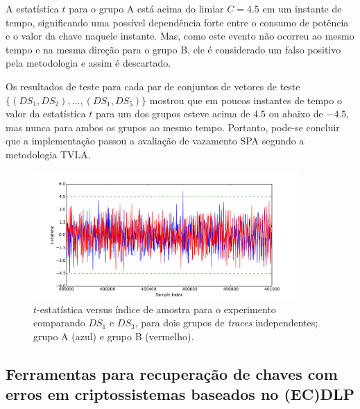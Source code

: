 \documentclass{SBCbookchapter}
\begin{document}
A estatística $t$ para o grupo A está acima do limiar $C = 4.5$ em um instante de tempo, significando uma possível dependência forte entre o consumo de potência e o valor da chave naquele instante. Mas, como este evento não ocorreu ao mesmo tempo e na mesma direção para o grupo B, ele é considerado um falso positivo pela metodologia e assim é descartado.
%
%

Os resultados de teste para cada par de conjuntos de vetores de teste $ \{(DS_1,DS_2), \dots, (DS_1,DS_5) \}$ mostrou que em poucos instantes de tempo o valor da estatística $t$ para um dos grupos esteve acima de $4.5$ ou abaixo de $-4.5$, mas nunca para ambos os grupos ao mesmo tempo.
%
Portanto, pode-se concluir que a implementação passou a avaliação de vazamento SPA segundo a metodologia TVLA.

\begin{figure}[htb]
	\centering
	\centerline{
		\includegraphics[width=0.9\textwidth]{figures/graph__t_statistic__x__sample_index_for_groups_A_and_B__pair_DS1_DS3-eps-converted-to.pdf}
	}
	\caption{
		$t$-estatística versus índice de amostra para o experimento comparando $DS_1$ e $DS_3$, para dois grupos de \emph{traces} independentes; grupo A (azul) e grupo B (vermelho).
	}
	\label{fig:graphtstat}
\end{figure}


%

\subsection{Ferramentas para recuperação de chaves com erros em criptossistemas baseados no (EC)DLP}
\end{document}
